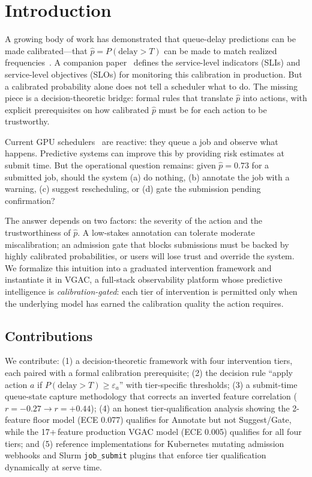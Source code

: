 \documentclass[sigconf]{acmart}
\begin{document}

\maketitle

\section{Introduction}
\label{sec:intro}
A growing body of work has demonstrated that queue-delay predictions can be made calibrated---that $\hat{p}=P(\text{delay} > T)$ can be made to match realized frequencies~\cite{guo2017calibration}. A companion paper~\cite{espira2026reliability} defines the service-level indicators (SLIs) and service-level objectives (SLOs) for monitoring this calibration in production. But a calibrated probability alone does not tell a scheduler what to do. The missing piece is a decision-theoretic bridge: formal rules that translate $\hat{p}$ into actions, with explicit prerequisites on how calibrated $\hat{p}$ must be for each action to be trustworthy.

Current GPU schedulers~\cite{borg,firmament} are reactive: they queue a job and observe what happens. Predictive systems can improve this by providing risk estimates at submit time. But the operational question remains: given $\hat{p}=0.73$ for a submitted job, should the system (a) do nothing, (b) annotate the job with a warning, (c) suggest rescheduling, or (d) gate the submission pending confirmation?

The answer depends on two factors: the severity of the action and the trustworthiness of $\hat{p}$. A low-stakes annotation can tolerate moderate miscalibration; an admission gate that blocks submissions must be backed by highly calibrated probabilities, or users will lose trust and override the system. We formalize this intuition into a graduated intervention framework and instantiate it in VGAC, a full-stack observability platform whose predictive intelligence is \emph{calibration-gated}: each tier of intervention is permitted only when the underlying model has earned the calibration quality the action requires.

\subsection{Contributions}
We contribute: (1) a decision-theoretic framework with four intervention tiers, each paired with a formal calibration prerequisite; (2) the decision rule ``apply action $a$ if $P(\text{delay} > T) \ge \varepsilon_a$'' with tier-specific thresholds; (3) a submit-time queue-state capture methodology that corrects an inverted feature correlation ($r=-0.27 \to r=+0.44$); (4) an honest tier-qualification analysis showing the 2-feature floor model (ECE 0.077) qualifies for Annotate but not Suggest/Gate, while the 17+\,feature production VGAC model (ECE 0.005) qualifies for all four tiers; and (5) reference implementations for Kubernetes mutating admission webhooks and Slurm \texttt{job\_submit} plugins that enforce tier qualification dynamically at serve time.
\end{document}

